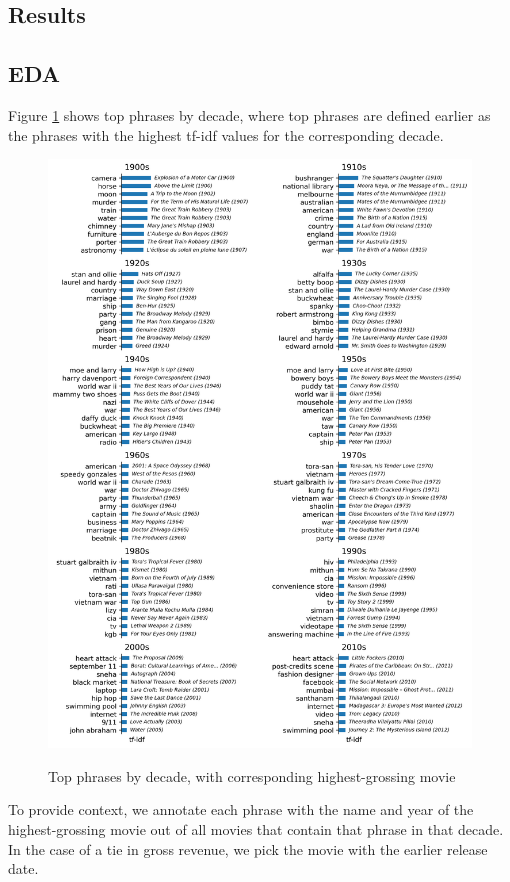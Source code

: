\documentclass{article}
\begin{document}
\begin{multicols}{2}
\section{Results} %
\subsection{EDA}
Figure \ref{figure:top_phrases_by_decade} shows top phrases by decade, where top phrases are defined earlier as the phrases with the highest tf-idf values for the corresponding decade.

\begin{figure}
\caption{Top phrases by decade, with corresponding highest-grossing movie}
\centering
\includegraphics[width=.95\textwidth]{figures/top_phrases_by_decade_bar_chart.png}
\label{figure:top_phrases_by_decade}
\end{figure}

To provide context, we annotate each phrase with the name and year of the highest-grossing movie out of all movies that contain that phrase in that decade. In the case of a tie in gross revenue, we pick the movie with the earlier release date.


\end{multicols}
\end{document}
